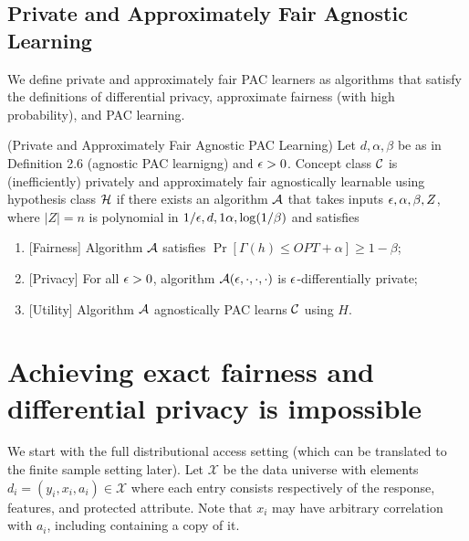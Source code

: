 \subsection{Private and Approximately Fair Agnostic Learning}
We define private and approximately fair PAC learners as algorithms that satisfy the definitions of differential privacy, approximate fairness (with high probability), and PAC learning.
\begin{defn}
	(Private and Approximately Fair Agnostic PAC Learning)
	Let $d, \alpha, \beta$ be as in Definition 2.6 (agnostic PAC
  learnigng) and $\epsilon > 0$. Concept class $\mathcal{C}$ is (inefficiently)
  privately and approximately fair agnostically learnable using
  hypothesis class $\mathcal{H}$ if there exists an algorithm $\mathcal{A}$ that takes
  inputs $\epsilon, \alpha, \beta, Z$, where $|Z|=n$ is polynomial in
  $1/\epsilon, d, 1\alpha, \log(1/\beta)$ and satisfies
	\begin{enumerate}
		\item {[}Fairness{]} Algorithm $\mathcal{A}$ satisfies $\Pr[\Gamma(h) \leq
    OPT + \alpha] \geq 1-\beta$;
		\item {[}Privacy{]} For all $\epsilon>0$, algorithm $\mathcal{A}(\epsilon, \cdot, \cdot, \cdot)$ is $\epsilon$-differentially private;
		\item {[}Utility{]} Algorithm $\mathcal{A}$ agnostically PAC learns $\mathcal{C}$ using $H$.
	\end{enumerate}
\end{defn}

\section{Achieving exact fairness and differential privacy is impossible}
We start with the full distributional access setting (which can be translated to the finite sample setting later). Let $\mathcal{X}$ be the data universe with elements $d_i = (y_i,x_i,a_i) \in \mathcal{X}$ where each entry consists respectively of the response, features, and protected attribute. Note that $x_i$ may have arbitrary correlation with $a_i$, including containing a copy of it.



